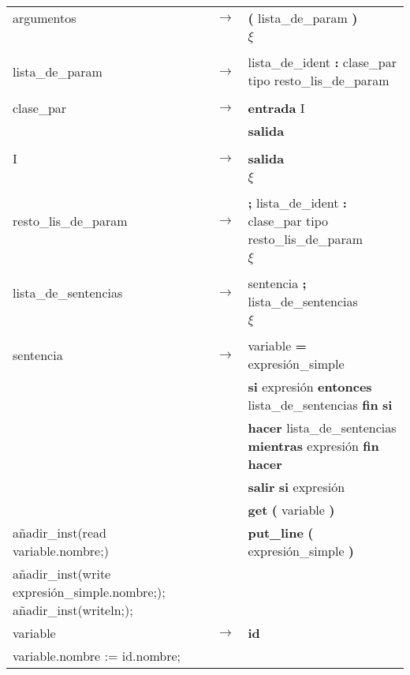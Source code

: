 \documentclass{article}
\begin{document}
\begin{tabular}{l c l}
argumentos &  $ \rightarrow $  & \textbf{(} lista\_de\_param \textbf{)} \\
                  & &  $ \xi $ \\
\\

lista\_de\_param &  $ \rightarrow $ & lista\_de\_ident \textbf{:} clase\_par tipo resto\_lis\_de\_param \\
\\

clase\_par & $ \rightarrow $ & \textbf{entrada} I \\
                  & &  \textbf{salida} \\
\\

I & $ \rightarrow $ & \textbf{salida} \\
                  & &  $ \xi $ \\
\\

resto\_lis\_de\_param & $ \rightarrow $ & \textbf{;} lista\_de\_ident \textbf{:} clase\_par tipo resto\_lis\_de\_param \\
                  & &  $ \xi $ \\
\\

lista\_de\_sentencias & $ \rightarrow $ & sentencia \textbf{;} lista\_de\_sentencias \\
                  & &  $ \xi $ \\
\\

sentencia & $ \rightarrow $ & variable \textbf{=} expresi\'{o}n\_simple \\
                  & & \textbf{si} expresi\'{o}n \textbf{entonces} lista\_de\_sentencias \textbf{fin} \textbf{si} \\
                  & & \textbf{hacer} lista\_de\_sentencias \textbf{mientras} expresi\'{o}n \textbf{fin} \textbf{hacer} \\
                  & & \textbf{salir} \textbf{si} expresi\'{o}n \\
                  & & \textbf{get} \textbf{(} variable \textbf{)} \\
						{añadir\_inst(read variable.nombre;)}
                  & & \textbf{put\_line} \textbf{(} expresi\'{o}n\_simple \textbf{)} \\
						{añadir\_inst(write expresión\_simple.nombre;);
						 añadir\_inst(writeln;);}
\\

variable & $ \rightarrow $ & \textbf{id} \\
						{variable.nombre := id.nombre;}
\\


\end{tabular}
\end{document}
